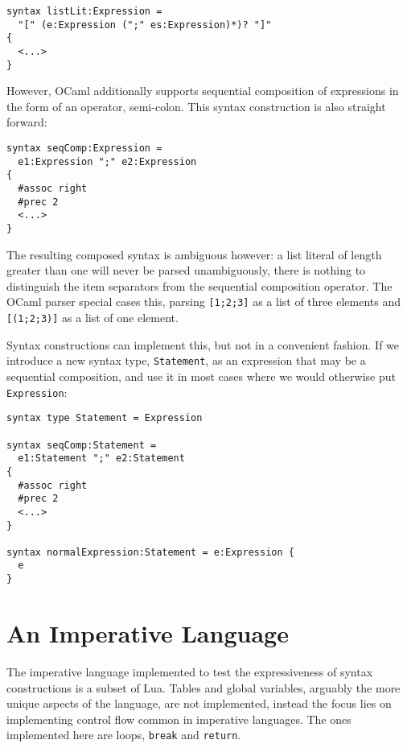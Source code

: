 \documentclass{kththesis}
\begin{document}
\begin{verbatim}
syntax listLit:Expression =
  "[" (e:Expression (";" es:Expression)*)? "]"
{
  <...>
}
\end{verbatim}

However, OCaml additionally supports sequential composition of expressions in the form of an operator, semi-colon. This syntax construction is also straight forward:

\begin{verbatim}
syntax seqComp:Expression =
  e1:Expression ";" e2:Expression
{
  #assoc right
  #prec 2
  <...>
}
\end{verbatim}

The resulting composed syntax is ambiguous however: a list literal of length greater than one will never be parsed unambiguously, there is nothing to distinguish the item separators from the sequential composition operator. The OCaml parser special cases this, parsing \texttt{[1;2;3]} as a list of three elements and \texttt{[(1;2;3)]} as a list of one element.

Syntax constructions can implement this, but not in a convenient fashion. If we introduce a new syntax type, \texttt{Statement}, as an expression that may be a sequential composition, and use it in most cases where we would otherwise put \texttt{Expression}:

\begin{verbatim}
syntax type Statement = Expression

syntax seqComp:Statement =
  e1:Statement ";" e2:Statement
{
  #assoc right
  #prec 2
  <...>
}

syntax normalExpression:Statement = e:Expression {
  e
}
\end{verbatim}

\section{An Imperative Language} \label{sec:imperative-eval}

The imperative language implemented to test the expressiveness of syntax constructions is a subset of Lua. %
Tables and global variables, arguably the more unique aspects of the language, are not implemented, instead the focus lies on implementing control flow common in imperative languages. The ones implemented here are loops, \texttt{break} and \texttt{return}.
\end{document}
